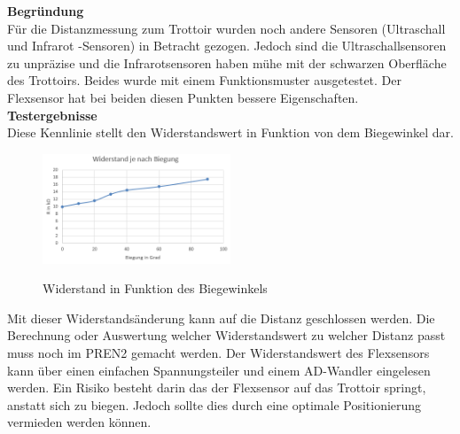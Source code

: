 %
\textbf{Begründung}\\[0.2cm]
Für die Distanzmessung zum Trottoir wurden noch andere Sensoren (Ultraschall und Infrarot -Sensoren) in Betracht gezogen. Jedoch sind die Ultraschallsensoren zu unpräzise und die Infrarotsensoren haben mühe mit der schwarzen Oberfläche des Trottoirs. Beides wurde mit einem Funktionsmuster ausgetestet. Der Flexsensor hat bei beiden diesen Punkten bessere Eigenschaften.\\[0.2cm]
\textbf{Testergebnisse}\\[0.2cm]
Diese Kennlinie stellt den Widerstandswert in Funktion von dem Biegewinkel dar.
\begin{figure}[H]
	\centering
	\includegraphics[width=0.5\textwidth]{03_Loesungskonzept/pictures/Flex_Biegungskennline.png}
	\label{fig:Flex_R_Kennlinie}
	\caption{Widerstand in Funktion des Biegewinkels}
\end{figure}\flushleft
%
Mit dieser Widerstandsänderung kann auf die Distanz geschlossen werden. Die Berechnung oder Auswertung welcher Widerstandswert zu welcher Distanz passt muss noch im PREN2 gemacht werden. Der Widerstandswert des Flexsensors kann über einen einfachen Spannungsteiler und einem AD-Wandler eingelesen werden.
Ein Risiko besteht darin das der Flexsensor auf das Trottoir springt, anstatt sich zu biegen. Jedoch sollte dies durch eine optimale Positionierung vermieden werden können.\\[0.2cm]